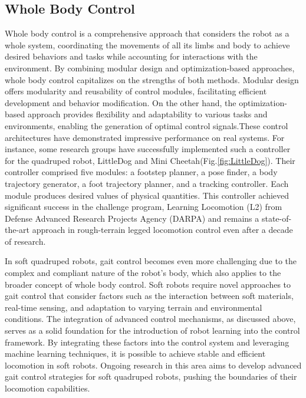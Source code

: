 \subsection{Whole Body Control}
Whole body control is a comprehensive approach that considers the robot as a whole system, coordinating the movements of all its limbs and body to achieve desired behaviors and tasks while accounting for interactions with the environment. By combining modular design and optimization-based approaches, whole body control capitalizes on the strengths of both methods. Modular design offers modularity and reusability of control modules, facilitating efficient development and behavior modification. On the other hand, the optimization-based approach provides flexibility and adaptability to various tasks and environments, enabling the generation of optimal control signals.These control architectures have demonstrated impressive performance on real systems. For instance, some research groups\cite{kalakrishnanFastRobustQuadruped2010,bledtMITCheetahDesign2018} have successfully implemented such a controller for the quadruped robot, LittleDog and Mini Cheetah(Fig.\ref{fig:LittleDog}). Their controller comprised five modules: a footstep planner, a pose finder, a body trajectory generator, a foot trajectory planner, and a tracking controller. Each module produces desired values of physical quantities. This controller achieved significant success in the challenge program\cite{neuhausComprehensiveSummaryInstitute2011}, Learning Locomotion (L2) from Defense Advanced Research Projects Agency (DARPA) and remains a state-of-the-art approach in rough-terrain legged locomotion control even after a decade of research.


In soft quadruped robots, gait control becomes even more challenging due to the complex and compliant nature of the robot's body, which also applies to the broader concept of whole body control. Soft robots require novel approaches to gait control that consider factors such as the interaction between soft materials, real-time sensing, and adaptation to varying terrain and environmental conditions. The integration of advanced control mechanisms, as discussed above, serves as a solid foundation for the introduction of robot learning into the control framework. By integrating these factors into the control system and leveraging machine learning techniques, it is possible to achieve stable and efficient locomotion in soft robots. Ongoing research in this area aims to develop advanced gait control strategies for soft quadruped robots, pushing the boundaries of their locomotion capabilities\cite{gongReviewGaitOptimization2010}.

